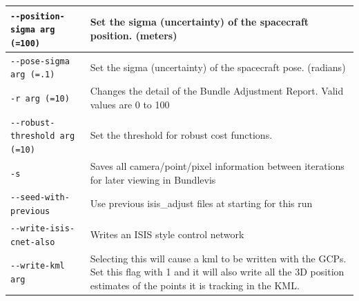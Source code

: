 \begin{longtable}{|l|p{10cm}|}
\verb#--position-sigma arg (=100)# & Set the sigma (uncertainty) of the spacecraft position. (meters) \\ \hline
\verb#--pose-sigma arg (=.1)# & Set the sigma (uncertainty) of the spacecraft pose. (radians) \\ \hline
\verb#-r arg (=10)# & Changes the detail of the Bundle Adjustment Report. Valid values are 0 to 100 \\ \hline
\verb#--robust-threshold arg (=10)# & Set the threshold for robust cost functions. \\ \hline
\verb#-s# & Saves all camera/point/pixel information between iterations for later viewing in Bundlevis \\ \hline
\verb#--seed-with-previous# & Use previous isis\_adjust files at starting for this run \\ \hline
\verb#--write-isis-cnet-also# & Writes an ISIS style control network \\ \hline
\verb#--write-kml arg# & Selecting this will cause a kml to be written with the GCPs. Set this flag with 1 and it will also write all the 3D position estimates of the points it is tracking in the KML. \\ \hline
\end{longtable}




